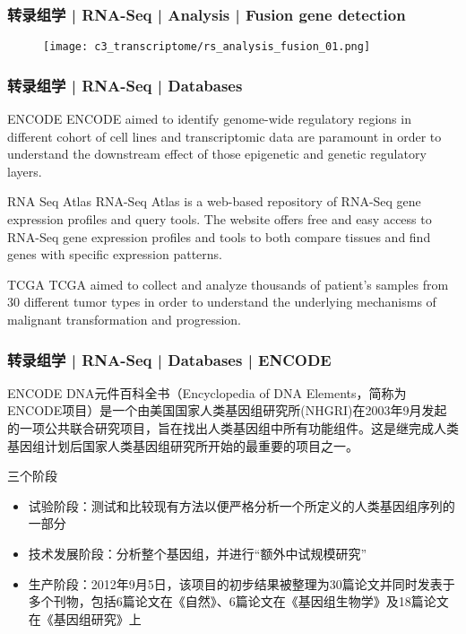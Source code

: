 \begin{frame}
  \frametitle{转录组学 | RNA-Seq | Analysis | Fusion gene detection}
  \begin{figure}
    \centering
    \texttt{[image: c3\_transcriptome/rs\_analysis\_fusion\_01.png]}
  \end{figure}
\end{frame}

\begin{frame}
  \frametitle{转录组学 | RNA-Seq | Databases}
  {\footnotesize
  \begin{block}{ENCODE}
    ENCODE aimed to identify genome-wide regulatory regions in different cohort of cell lines and transcriptomic data are paramount in order to understand the downstream effect of those epigenetic and genetic regulatory layers.
  \end{block}
  \pause
  \begin{block}{RNA Seq Atlas}
    RNA-Seq Atlas is a web-based repository of RNA-Seq gene expression profiles and query tools. The website offers free and easy access to RNA-Seq gene expression profiles and tools to both compare tissues and find genes with specific expression patterns.
  \end{block}
  \pause
  \begin{block}{TCGA}
    TCGA aimed to collect and analyze thousands of patient's samples from 30 different tumor types in order to understand the underlying mechanisms of malignant transformation and progression.
  \end{block}
}
\end{frame}

\begin{frame}
  \frametitle{转录组学 | RNA-Seq | Databases | ENCODE}
  \begin{block}{ENCODE}
 DNA元件百科全书（Encyclopedia of DNA Elements，简称为ENCODE项目）是一个由美国国家人类基因组研究所(NHGRI)在2003年9月发起的一项公共联合研究项目，旨在找出人类基因组中所有功能组件。这是继完成人类基因组计划后国家人类基因组研究所开始的最重要的项目之一。
  \end{block}
  \pause
  \begin{block}{三个阶段}
    \begin{itemize}
      \item 试验阶段：测试和比较现有方法以便严格分析一个所定义的人类基因组序列的一部分
      \item 技术发展阶段：分析整个基因组，并进行“额外中试规模研究”
      \item 生产阶段：2012年9月5日，该项目的初步结果被整理为30篇论文并同时发表于多个刊物，包括6篇论文在《自然》、6篇论文在《基因组生物学》及18篇论文在《基因组研究》上
    \end{itemize}
  \end{block}
\end{frame}


